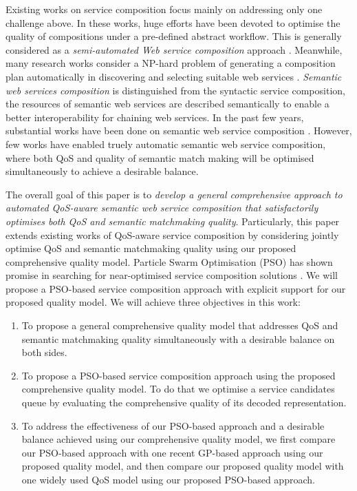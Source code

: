 \documentclass{llncs}
\begin{document}
Existing works on service composition focus mainly on addressing only one challenge above. In these works, huge efforts have been devoted to optimise the quality of compositions under a pre-defined abstract workflow. This is generally considered as a \textit{semi-automated Web service composition} approach \cite{parejo2008qos}. Meanwhile, many research works consider a NP-hard problem of generating a composition plan automatically in discovering and selecting suitable web services \cite{moghaddam2014service}. \textit{Semantic web services composition} is distinguished from the syntactic service composition, the resources of semantic web services are described semantically to enable a better interoperability for chaining web services. In the past few years, substantial works have been done on semantic web service composition \cite{bansal2016generalized,boustil2014semantic,mier2015integrated}. However, few works have enabled truely automatic semantic web service composition, where both QoS and quality of semantic match making will be optimised simultaneously to achieve a desirable balance.

The overall goal of this paper is to \textit{develop a general comprehensive approach to automated QoS-aware semantic web service composition that satisfactorily optimises both QoS and semantic matchmaking quality}. Particularly, this paper extends existing works of QoS-aware service composition by considering jointly optimise QoS and semantic matchmaking quality using our proposed comprehensive quality model. Particle Swarm Optimisation (PSO) has shown promise in searching for near-optimised service composition solutions \cite{da2016particle}. We will propose a PSO-based service composition approach with explicit support for our proposed quality model. We will achieve three objectives in this work:

\begin{enumerate}
 \item To propose a general comprehensive quality model that addresses QoS and semantic matchmaking quality simultaneously with a desirable balance on both sides.
  
 \item To propose a PSO-based service composition approach using the proposed comprehensive quality model. To do that we optimise a service candidates queue by evaluating the comprehensive quality of its decoded representation.
  
 \item To address the effectiveness of our PSO-based approach and a desirable balance achieved using our comprehensive quality model, we first compare our PSO-based approach with one recent GP-based approach \cite{ma2015hybrid} using our proposed quality model, and then compare our proposed quality model with one widely used QoS model using our proposed PSO-based approach.
\end{enumerate}
\end{document}
